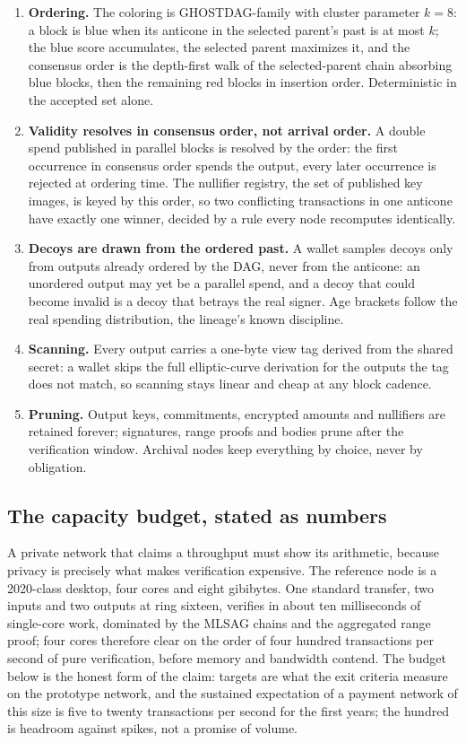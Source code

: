 \begin{enumerate}[leftmargin=1.8em, itemsep=2pt]
\item \textbf{Ordering.} The coloring is GHOSTDAG-family with cluster
parameter $k = 8$: a block is blue when its anticone in the selected
parent's past is at most $k$; the blue score accumulates, the selected
parent maximizes it, and the consensus order is the depth-first walk of
the selected-parent chain absorbing blue blocks, then the remaining red
blocks in insertion order. Deterministic in the accepted set alone.
\item \textbf{Validity resolves in consensus order, not arrival order.}
A double spend published in parallel blocks is resolved by the order: the
first occurrence in consensus order spends the output, every later
occurrence is rejected at ordering time. The nullifier registry, the set
of published key images, is keyed by this order, so two conflicting
transactions in one anticone have exactly one winner, decided by a rule
every node recomputes identically.
\item \textbf{Decoys are drawn from the ordered past.} A wallet samples
decoys only from outputs already ordered by the DAG, never from the
anticone: an unordered output may yet be a parallel spend, and a decoy
that could become invalid is a decoy that betrays the real signer. Age
brackets follow the real spending distribution, the lineage's known
discipline.
\item \textbf{Scanning.} Every output carries a one-byte view tag derived
from the shared secret: a wallet skips the full elliptic-curve derivation
for the outputs the tag does not match, so scanning stays linear and
cheap at any block cadence.
\item \textbf{Pruning.} Output keys, commitments, encrypted amounts and
nullifiers are retained forever; signatures, range proofs and bodies
prune after the verification window. Archival nodes keep everything by
choice, never by obligation.
\end{enumerate}

\subsection{The capacity budget, stated as numbers}

A private network that claims a throughput must show its arithmetic,
because privacy is precisely what makes verification expensive. The
reference node is a 2020-class desktop, four cores and eight gibibytes.
One standard transfer, two inputs and two outputs at ring sixteen,
verifies in about ten milliseconds of single-core work, dominated by the
MLSAG chains and the aggregated range proof; four cores therefore clear
on the order of four hundred transactions per second of pure
verification, before memory and bandwidth contend. The budget below is
the honest form of the claim: targets are what the exit criteria measure
on the prototype network, and the sustained expectation of a payment
network of this size is five to twenty transactions per second for the
first years; the hundred is headroom against spikes, not a promise of
volume.

